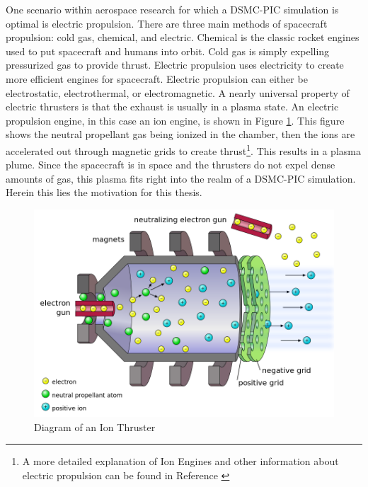 \indent One scenario within aerospace research for which a DSMC-PIC simulation is optimal is electric propulsion. There are three main methods of spacecraft propulsion: cold gas, chemical, and electric. Chemical is the classic rocket engines used to put spacecraft and humans into orbit. Cold gas is simply expelling pressurized gas to provide thrust. Electric propulsion uses electricity to create more efficient engines for spacecraft. Electric propulsion can either be electrostatic, electrothermal, or electromagnetic. A nearly universal property of electric thrusters is that the exhaust is usually in a plasma state. An electric propulsion engine, in this case an ion engine, is shown in Figure \ref{fig:ion_thruster}. This figure shows the neutral propellant gas being ionized in the chamber, then the ions are accelerated out through magnetic grids to create thrust\footnote{A more detailed explanation of Ion Engines and other information about electric propulsion can be found in Reference \cite{gobel}}. This results in a plasma plume. Since the spacecraft is in space and the thrusters do not expel dense amounts of gas, this plasma fits right into the realm of a DSMC-PIC simulation. Herein this lies the motivation for this thesis. \par


\begin{figure}
    \includegraphics[width=.85\textwidth]{figures/ion_thruster.png}
    \centering
    \caption[Diagram of an Ion Thruster]{Diagram of an Ion Thruster \cite{ion_thruster} }
    \label{fig:ion_thruster}
\end{figure}



